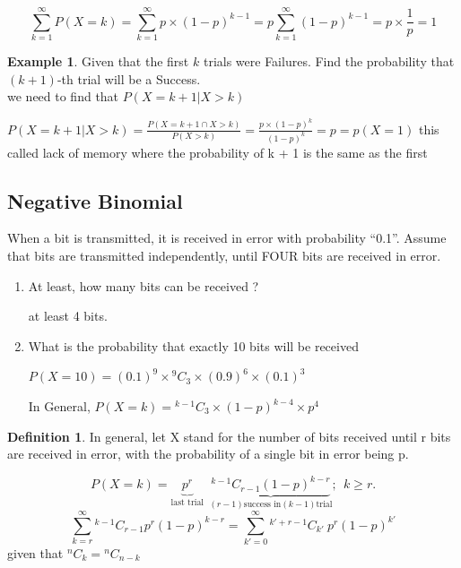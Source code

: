 \documentclass[12pt]{article}
\theoremstyle{definition}
\newtheorem{exmp}{Example}[section]
\newtheorem{slo}{Definition}[section]
\newcommand*{\Comb}[2]{{}^{#1}C_{#2}}%
\begin{document}
\begin{equation}
    \displaystyle \sum_{k = 1}^{\infty}   P(X = k) = \sum_{k = 1}^{\infty}p \times (1 - p)^{k-1}
    = p\sum_{k = 1}^{\infty}(1 - p)^{k-1} = p \times \frac{1}{p} = 1
\end{equation}    
\begin{exmp}
    Given that the first $k$ trials were Failures. Find the probability that $(k+1)$-th trial will be a Success. \\

    we need to find that $P(X = k + 1 | X > k)$
    \begin{center}
        $ \displaystyle  P(X = k + 1 | X > k) = \frac{P(X=k+1 \cap X>k)}{P(X>k)}
        = \frac{p \times (1-p)^k}{(1-p)^k} = p = p(X = 1)$  this called lack of memory where the probability
        of k + 1 is the same as the first
\end{center}
\end{exmp}    
\subsection{Negative Binomial}
When a bit is transmitted, it is received in error with probability “0.1”.
Assume that bits are transmitted independently, until FOUR bits are received in error.
\begin{enumerate}
    \item At least, how many bits can be received ?
        \begin{center}
            at least 4 bits.
        \end{center}   
    \item What is the probability that exactly 10 bits will be received
        \begin{center}
            $  P(X= 10) = (0.1)^9 \times \Comb{9}{3} \times (0.9)^6 \times (0.1)^3 $
        \end{center}   
        In General, $P(X = k) = \Comb{k-1}{3} \times (1-p)^{k-4} \times p^4$

\end{enumerate}   
\begin{slo}
 In general, let X stand for the number of bits
received until r bits are received in error, with
the probability of a single bit in error being p.
\end{slo}   
\begin{equation}
    P(X = k) =  \underbrace{p^r}_{\text{last trial}} 
    \ \ \underbrace{\Comb{k-1}{r-1} (1-p)^{k-r}}_{\text{$(r - 1)$success in$(k - 1)$trial}}; \ \ k \geq r. 
\end{equation}
\begin{equation}
    \displaystyle \sum_{k=r}^{\infty} \Comb{k-1}{r-1} p^r(1-p)^{k-r} =
    \sum_{k' = 0}^{\infty} \Comb{k' + r -1}{k'} \ p^r (1-p)^{k'}
\end{equation}
given that $ \displaystyle \Comb{n}{k} = \Comb{n}{n- k}$
\end{document}
